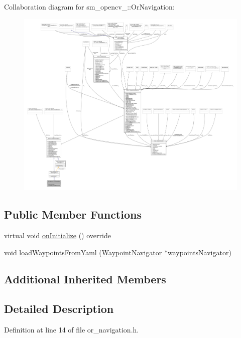 Collaboration diagram for sm\+\_\+opencv\+\_\+:\+:Or\+Navigation\+:
\nopagebreak
\begin{figure}[H]
\begin{center}
\leavevmode
\includegraphics[width=350pt]{classsm__opencv__2_1_1OrNavigation__coll__graph}
\end{center}
\end{figure}
\subsection*{Public Member Functions}
\begin{DoxyCompactItemize}
\item 
virtual void \hyperlink{classsm__opencv__2_1_1OrNavigation_a57483274c7e02b66cc528b910108efe5}{on\+Initialize} () override
\item 
void \hyperlink{classsm__opencv__2_1_1OrNavigation_a7d151913cbad3b640163c4b2e84bfb35}{load\+Waypoints\+From\+Yaml} (\hyperlink{classcl__move__base__z_1_1WaypointNavigator}{Waypoint\+Navigator} $\ast$waypoints\+Navigator)
\end{DoxyCompactItemize}
\subsection*{Additional Inherited Members}


\subsection{Detailed Description}


Definition at line 14 of file or\+\_\+navigation.\+h.



